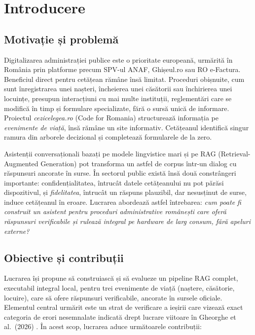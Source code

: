 \chapter{Introducere}

\section{Motivație și problemă}

Digitalizarea administrației publice este o prioritate europeană, urmărită în România prin platforme precum SPV-ul ANAF, Ghișeul.ro sau RO e-Factura. Beneficiul direct pentru cetățean rămâne însă limitat. Proceduri obișnuite, cum sunt înregistrarea unei nașteri, încheierea unei căsătorii sau închirierea unei locuințe, presupun interacțiuni cu mai multe instituții, reglementări care se modifică în timp și formulare specializate, fără o sursă unică de informare. Proiectul \emph{cezicelegea.ro} (Code for Romania) structurează informația pe \emph{evenimente de viață}, însă rămâne un site informativ. Cetățeanul identifică singur ramura din arborele decizional și completează formularele de la zero.

Asistenții conversaționali bazați pe modele lingvistice mari și pe RAG (Retrieval-Augmented Generation) pot transforma un astfel de corpus într-un dialog cu răspunsuri ancorate în surse. În sectorul public există însă două constrângeri importante: confidențialitatea, întrucât datele cetățeanului nu pot părăsi dispozitivul, și \emph{fidelitatea}, întrucât un răspuns plauzibil, dar nesusținut de surse, induce cetățeanul în eroare. Lucrarea abordează astfel întrebarea: \emph{cum poate fi construit un asistent pentru proceduri administrative românești care oferă răspunsuri verificabile și rulează integral pe hardware de larg consum, fără apeluri externe?}

\section{Obiective și contribuții}

Lucrarea își propune să construiască și să evalueze un pipeline RAG complet, executabil integral local, pentru trei evenimente de viață (naștere, căsătorie, locuire), care să ofere răspunsuri verificabile, ancorate în sursele oficiale. Elementul central urmărit este un strat de verificare a ieșirii care vizează exact categoria de erori nesemnalate indicată drept lucrare viitoare în Gheorghe et al.\ (2026) \cite{gheorghe2026robust}. În acest scop, lucrarea aduce următoarele contribuții:

